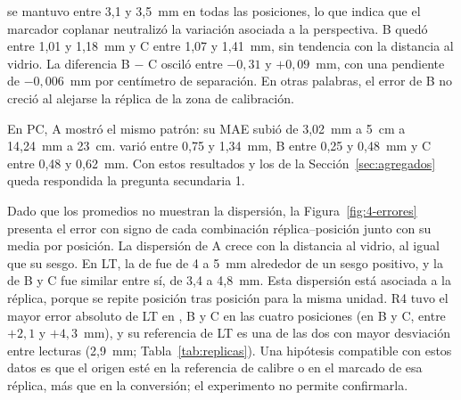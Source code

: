 \Aprime{} se mantuvo entre 3,1 y 3,5~mm en todas las posiciones, lo que indica que el marcador coplanar neutralizó la variación asociada a la perspectiva. B quedó entre 1,01 y 1,18~mm y C entre 1,07 y 1,41~mm, sin tendencia con la distancia al vidrio. La diferencia B $-$ C osciló entre $-0{,}31$ y $+0{,}09$~mm, con una pendiente de $-0{,}006$~mm por centímetro de separación. En otras palabras, el error de B no creció al alejarse la réplica de la zona de calibración.

En PC, A mostró el mismo patrón: su MAE subió de 3,02~mm a 5~cm a 14,24~mm a 23~cm. \Aprime{} varió entre 0,75 y 1,34~mm, B entre 0,25 y 0,48~mm y C entre 0,48 y 0,62~mm. Con estos resultados y los de la Sección~\ref{sec:agregados} queda respondida la pregunta secundaria 1.

Dado que los promedios no muestran la dispersión, la Figura~\ref{fig:4-errores} presenta el error con signo de cada combinación réplica--posición junto con su media por posición. La dispersión de A crece con la distancia al vidrio, al igual que su sesgo. En LT, la de \Aprime{} fue de 4 a 5~mm alrededor de un sesgo positivo, y la de B y C fue similar entre sí, de 3,4 a 4,8~mm. Esta dispersión está asociada a la réplica, porque se repite posición tras posición para la misma unidad. R4 tuvo el mayor error absoluto de LT en \Aprime, B y C en las cuatro posiciones (en B y C, entre $+2{,}1$ y $+4{,}3$~mm), y su referencia de LT es una de las dos con mayor desviación entre lecturas (2,9~mm; Tabla~\ref{tab:replicas}). Una hipótesis compatible con estos datos es que el origen esté en la referencia de calibre o en el marcado de esa réplica, más que en la conversión; el experimento no permite confirmarla.

